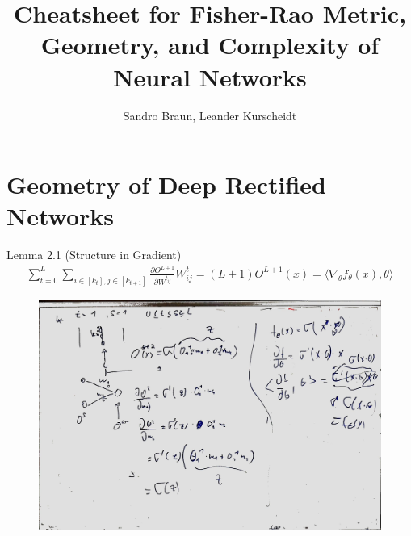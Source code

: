 \documentclass[a4paper]{article}
\title{Cheatsheet for Fisher-Rao Metric, Geometry, and Complexity of Neural Networks}
\author{Sandro Braun, Leander Kurscheidt}
\begin{document}
\maketitle
\begin{abstract}
\end{abstract}
\section{Geometry of Deep Rectified Networks}

Lemma 2.1 (Structure in Gradient)
\begin{align}
	\sum_{t=0}^{L} \sum_{i \in [k_t], j \in [k_{t+1}]} \frac{\partial O^{L+1}}{\partial W^{t_{ij}}} W^t_{ij} = (L+1)O^{L+1}(x) = \langle \nabla_\theta f_\theta (x), \theta \rangle
\end{align}

\begin{figure}
	\centering
	\includegraphics[width=\textwidth]{whiteboard_notes/20180706_01.jpg}
\end{figure}
\end{document}
